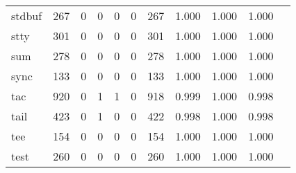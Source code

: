 \begin{longtable}{lp{1.10cm}p{1.10cm}p{1.10cm}p{1.10cm}p{1.10cm}p{1.10cm}p{1.10cm}p{1.10cm}p{1.10cm}p{1.10cm}}
stdbuf    &                    267 &                                  0 &                                 0 &                                0 &                                 0 &                             267 &                             1.000 &                                 1.000 &                               1.000 \\
stty      &                    301 &                                  0 &                                 0 &                                0 &                                 0 &                             301 &                             1.000 &                                 1.000 &                               1.000 \\
sum       &                    278 &                                  0 &                                 0 &                                0 &                                 0 &                             278 &                             1.000 &                                 1.000 &                               1.000 \\
sync      &                    133 &                                  0 &                                 0 &                                0 &                                 0 &                             133 &                             1.000 &                                 1.000 &                               1.000 \\
tac       &                    920 &                                  0 &                                 1 &                                1 &                                 0 &                             918 &                             0.999 &                                 1.000 &                               0.998 \\
tail      &                    423 &                                  0 &                                 1 &                                0 &                                 0 &                             422 &                             0.998 &                                 1.000 &                               0.998 \\
tee       &                    154 &                                  0 &                                 0 &                                0 &                                 0 &                             154 &                             1.000 &                                 1.000 &                               1.000 \\
test      &                    260 &                                  0 &                                 0 &                                0 &                                 0 &                             260 &                             1.000 &                                 1.000 &                               1.000 \\

\end{longtable}
